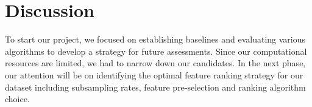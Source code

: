 \documentclass[fleqn,moreauthors,10pt]{ds_report}
\begin{document}




\section*{Discussion}

To start our project, we focused on establishing baselines and evaluating various algorithms to develop a strategy for future assessments. Since our computational resources are limited, we had to narrow down our candidates. In the next phase, our attention will be on identifying the optimal feature ranking strategy for our dataset including subsampling rates, feature pre-selection and ranking algorithm choice.






% 
% 
\end{document}
